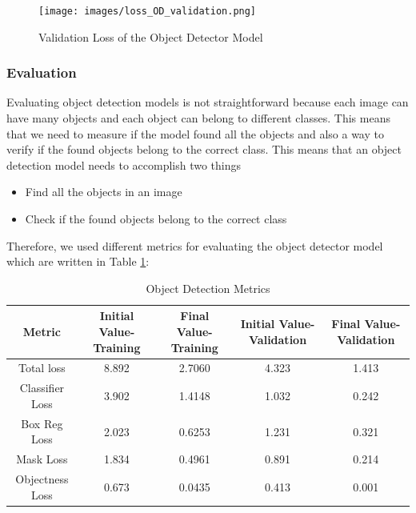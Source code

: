 \documentclass[a4paper, openany]{book}
\begin{document}
\begin{figure}[ht]
  \centering
    \texttt{[image: images/loss\_OD\_validation.png]}
      \caption{Validation Loss of the Object Detector Model}
  \label{fig:loss_OD_validation}
\end{figure}

\newpage

\subsubsection{Evaluation}
	\vspace{0.3cm}



Evaluating object detection models is not straightforward because each image can have many objects and each object can belong to different classes. This means that we need to measure if the model found all the objects and also a way to verify if the found objects belong to the correct class. This means that an object detection model needs to accomplish two things

\begin{itemize}
\item Find all the objects in an image
\item Check if the found objects belong to the correct class
\end{itemize}

Therefore, we used different metrics for evaluating the object detector model which are written in Table \ref{table:OD_Metrics}:


\begin{table}[htp]
\caption{Object Detection Metrics}
\begin{center}
\begin{tabular}{c | c | c | c | c}
Metric & Initial Value-Training & Final Value-Training& Initial Value-Validation & Final Value-Validation\\
\hline
Total loss &8.892 & 2.7060 & 4.323 & 1.413\\
Classifier Loss & 3.902 & 1.4148 & 1.032 & 0.242\\
Box Reg Loss& 2.023 & 0.6253 & 1.231 & 0.321\\
Mask Loss & 1.834 & 0.4961 & 0.891 & 0.214\\
Objectness Loss& 0.673 & 0.0435 & 0.413 & 0.001
\end{tabular}
\end{center}
\label{table:OD_Metrics}
\end{table}%
\end{document}
